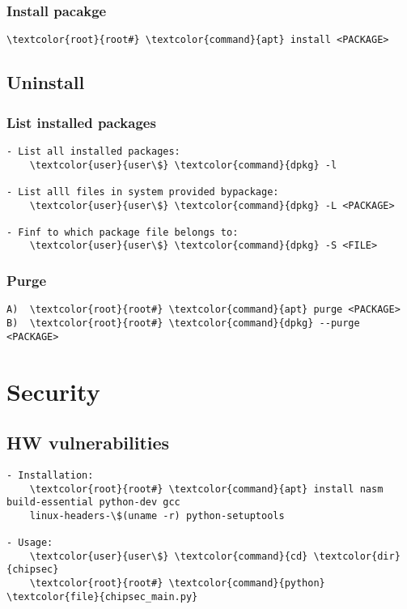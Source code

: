 \documentclass[10pt, a4paper, onecolumn, openany]{book} %
\begin{document}
\subsection{Install pacakge}
\begin{Verbatim}[commandchars=\\\{\}]
    \textcolor{root}{root#} \textcolor{command}{apt} install <PACKAGE>
\end{Verbatim}

\section{Uninstall}
\subsection{List installed packages}
\begin{Verbatim}[commandchars=\\\{\}]
- List all installed packages:
    \textcolor{user}{user\$} \textcolor{command}{dpkg} -l
    
- List alll files in system provided bypackage:
    \textcolor{user}{user\$} \textcolor{command}{dpkg} -L <PACKAGE>
    
- Finf to which package file belongs to:
    \textcolor{user}{user\$} \textcolor{command}{dpkg} -S <FILE>
\end{Verbatim}

\subsection{Purge}
\begin{Verbatim}[commandchars=\\\{\}]
A)  \textcolor{root}{root#} \textcolor{command}{apt} purge <PACKAGE>
B)  \textcolor{root}{root#} \textcolor{command}{dpkg} --purge <PACKAGE>
\end{Verbatim}


\chapter{Security}
\section{HW vulnerabilities}
\begin{Verbatim}[commandchars=\\\{\}]
- Installation:
    \textcolor{root}{root#} \textcolor{command}{apt} install nasm build-essential python-dev gcc 
    linux-headers-\$(uname -r) python-setuptools
    
- Usage: 
    \textcolor{user}{user\$} \textcolor{command}{cd} \textcolor{dir}{chipsec}
    \textcolor{root}{root#} \textcolor{command}{python} \textcolor{file}{chipsec_main.py}
\end{Verbatim}
\end{document}
